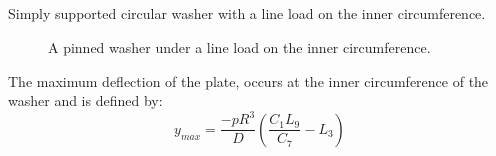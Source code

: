 \documentclass[10pt,letterpaper]{report}
\numberwithin{equation}{chapter}
\begin{document}
\newpage
\subsection{}
\label{subsec:pwp} %
Simply supported circular washer with a line load on the inner circumference.
\begin{figure}[!ht]
\centering
\label{fig:pwp}
    \hfill
    \caption{A pinned washer under a line load on the inner circumference.}
    \label{fig:dummy}
\end{figure}
The maximum deflection of the plate, occurs at the inner circumference of the washer and is defined by:
\[y_{max}=\frac{-p R^3}{D}\left(\frac{C_1 L_9}{C_7} - L_3\right)\]

\end{document}
